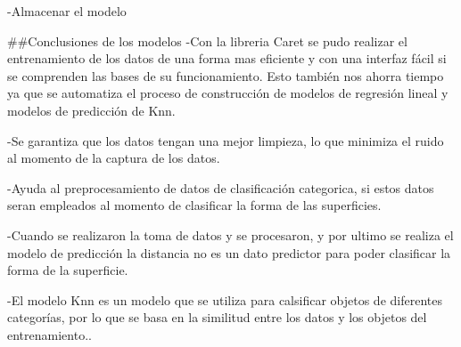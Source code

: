 \documentclass[
]{article}
\begin{document}
-Almacenar el modelo

\#\#Conclusiones de los modelos -Con la libreria Caret se pudo realizar
el entrenamiento de los datos de una forma mas eficiente y con una
interfaz fácil si se comprenden las bases de su funcionamiento. Esto
también nos ahorra tiempo ya que se automatiza el proceso de
construcción de modelos de regresión lineal y modelos de predicción de
Knn.

-Se garantiza que los datos tengan una mejor limpieza, lo que minimiza
el ruido al momento de la captura de los datos.

-Ayuda al preprocesamiento de datos de clasificación categorica, si
estos datos seran empleados al momento de clasificar la forma de las
superficies.

-Cuando se realizaron la toma de datos y se procesaron, y por ultimo se
realiza el modelo de predicción la distancia no es un dato predictor
para poder clasificar la forma de la superficie.

-El modelo Knn es un modelo que se utiliza para calsificar objetos de
diferentes categorías, por lo que se basa en la similitud entre los
datos y los objetos del entrenamiento..
\end{document}
